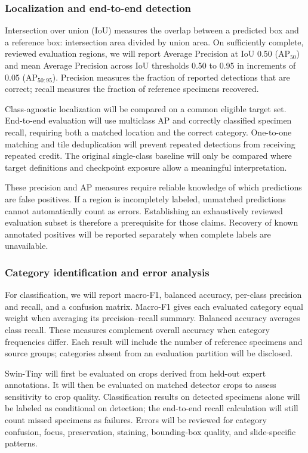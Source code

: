 \documentclass[conference,letterpaper]{IEEEtran}
\begin{document}
\subsubsection{Localization and end-to-end detection}
Intersection over union (IoU) measures the overlap between a predicted box and a reference box: intersection area divided by union area. On sufficiently complete, reviewed evaluation regions, we will report Average Precision at IoU 0.50 ($\mathrm{AP}_{50}$) and mean Average Precision across IoU thresholds 0.50 to 0.95 in increments of 0.05 ($\mathrm{AP}_{50:95}$). Precision measures the fraction of reported detections that are correct; recall measures the fraction of reference specimens recovered.

Class-agnostic localization will be compared on a common eligible target set. End-to-end evaluation will use multiclass AP and correctly classified specimen recall, requiring both a matched location and the correct category. One-to-one matching and tile deduplication will prevent repeated detections from receiving repeated credit. The original single-class baseline will only be compared where target definitions and checkpoint exposure allow a meaningful interpretation.

These precision and AP measures require reliable knowledge of which predictions are false positives. If a region is incompletely labeled, unmatched predictions cannot automatically count as errors. Establishing an exhaustively reviewed evaluation subset is therefore a prerequisite for those claims. Recovery of known annotated positives will be reported separately when complete labels are unavailable.

\subsubsection{Category identification and error analysis}
For classification, we will report macro-F1, balanced accuracy, per-class precision and recall, and a confusion matrix. Macro-F1 gives each evaluated category equal weight when averaging its precision--recall summary. Balanced accuracy averages class recall. These measures complement overall accuracy when category frequencies differ. Each result will include the number of reference specimens and source groups; categories absent from an evaluation partition will be disclosed.

Swin-Tiny will first be evaluated on crops derived from held-out expert annotations. It will then be evaluated on matched detector crops to assess sensitivity to crop quality. Classification results on detected specimens alone will be labeled as conditional on detection; the end-to-end recall calculation will still count missed specimens as failures. Errors will be reviewed for category confusion, focus, preservation, staining, bounding-box quality, and slide-specific patterns.
\end{document}
